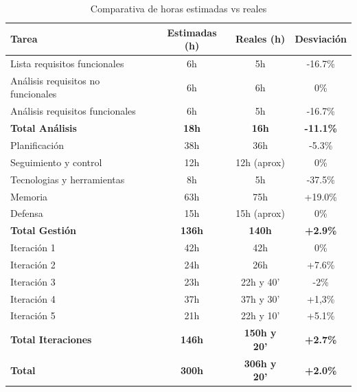 \begin{table}[H]
    \centering
    \begin{tabular}{|l|c|c|c|}
        \hline
        \textbf{Tarea} & \textbf{Estimadas (h)} & \textbf{Reales (h)} & \textbf{Desviación} \\
        \hline
        Lista requisitos funcionales & 6h & 5h       & -16.7\%     \\
        Análisis requisitos no funcionales & 6h & 6h       & 0\%     \\
        Análisis requisitos funcionales & 6h & 5h       & -16.7\%     \\
        \hline 
        \textbf{Total Análisis} & \textbf{18h} & \textbf{16h} & \textbf{-11.1\%} \\
        \hline
        Planificación & 38h & 36h       & -5.3\%     \\
        Seguimiento y control & 12h & 12h (aprox)       & 0\%     \\
        Tecnologias y herramientas & 8h & 5h       & -37.5\%     \\
        Memoria & 63h & 75h       & +19.0\%     \\
        Defensa & 15h & 15h (aprox)       & 0\%     \\
        \hline
        \textbf{Total Gestión} & \textbf{136h} & \textbf{140h} & \textbf{+2.9\%} \\
        \hline

        Iteración 1       & 42h  & 42h & 0\% \\
        Iteración 2       & 24h & 26h & +7.6\% \\
        Iteración 3       & 23h & 22h y 40' & -2\% \\
        Iteración 4       & 37h & 37h y 30' & +1,3\% \\
        Iteración 5       & 21h & 22h y 10' & +5.1\% \\
        \hline
        \textbf{Total Iteraciones} & \textbf{146h} & \textbf{150h y 20'} & \textbf{+2.7\%} \\
        \hline
        \textbf{Total } & \textbf{300h} & \textbf{306h y 20'} & \textbf{+2.0\%} \\
        \hline
    \end{tabular}
    \caption{Comparativa de horas estimadas vs reales}
    \label{tab:horas-comparativa-total}
\end{table}


